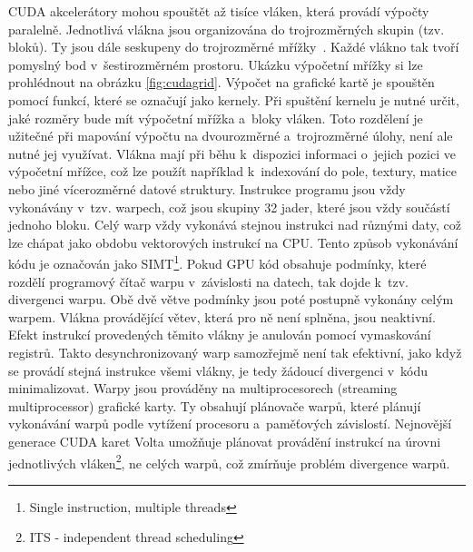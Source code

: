 CUDA akcelerátory mohou spouštět až tisíce vláken, která provádí výpočty paralelně. Jednotlivá vlákna jsou organizována do trojrozměrných skupin (tzv. bloků). Ty jsou dále seskupeny do trojrozměrné mřížky~\cite{cudacguide}. Každé vlákno tak tvoří pomyslný bod v~šestirozměrném prostoru. Ukázku výpočetní mřížky si lze prohlédnout na obrázku \ref{fig:cudagrid}. Výpočet na grafické kartě je spouštěn pomocí funkcí, které se označují jako kernely. Při spuštění kernelu je nutné určit, jaké rozměry bude mít výpočetní mřížka a~bloky vláken. Toto rozdělení je užitečné při mapování výpočtu na dvourozměrné a~trojrozměrné úlohy, není ale nutné jej využívat. Vlákna mají při běhu k~dispozici informaci o~jejich pozici ve výpočetní mřížce, což lze použít například k~indexování do pole, textury, matice nebo jiné vícerozměrné datové struktury. Instrukce programu jsou vždy vykonávány v~tzv. warpech, což jsou skupiny 32 jader, které jsou vždy součástí jednoho bloku. Celý warp vždy vykonává stejnou instrukci nad různými daty, což lze chápat jako obdobu vektorových instrukcí na CPU. Tento způsob vykonávání kódu je označován jako SIMT\footnote{Single instruction, multiple threads}. Pokud GPU kód obsahuje podmínky, které rozdělí programový čítač warpu v~závislosti na datech, tak dojde k~tzv. divergenci warpu. Obě dvě větve podmínky jsou poté postupně vykonány celým warpem. Vlákna provádějící větev, která pro ně není splněna, jsou neaktivní. Efekt instrukcí provedených těmito vlákny je anulován pomocí vymaskování registrů. Takto desynchronizovaný warp samozřejmě není tak efektivní, jako když se provádí stejná instrukce všemi vlákny, je tedy žádoucí divergenci v~kódu minimalizovat. Warpy jsou prováděny na multiprocesorech (streaming multiprocessor) grafické karty. Ty obsahují plánovače warpů, které plánují vykonávání warpů podle vytížení procesoru a~paměťových závislostí. Nejnovější generace CUDA karet Volta umožňuje plánovat provádění instrukcí na úrovni jednotlivých vláken\footnote{ITS - independent thread scheduling}, ne celých warpů, což zmírňuje problém divergence warpů.


